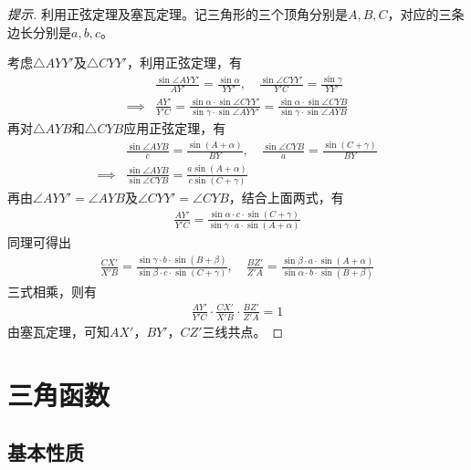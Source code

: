 \begin{proof}[提示]利用正弦定理及塞瓦定理。记三角形的三个顶角分别是$A,B,C$，对应的三条边长分别是$a,b,c$。

  考虑$\triangle AYY'$及$\triangle CYY'$，利用正弦定理，有
  \begin{align*}
    &\frac{\sin\angle AYY'}{AY'} = \frac{\sin\alpha}{YY'}, \quad
      \frac{\sin\angle CYY'}{Y'C} = \frac{\sin\gamma}{YY'}\\[3pt]
    \implies& \frac{AY'}{Y'C} = \frac{\sin\alpha\cdot \sin\angle CYY'}{\sin\gamma\cdot\sin\angle AYY'}
              = \frac{\sin\alpha\cdot \sin\angle CYB}{\sin\gamma\cdot\sin\angle AYB}
  \end{align*}
  再对$\triangle AYB$和$\triangle CYB$应用正弦定理，有
  \begin{align*}
    &\frac{\sin\angle AYB}{c}=\frac{\sin(A+\alpha)}{BY},\quad
      \frac{\sin\angle CYB}{a}=\frac{\sin(C+\gamma)}{BY}\\
    \implies& \frac{\sin\angle AYB}{\sin\angle CYB}=\frac{a\sin(A+\alpha)}{c\sin(C+\gamma)}
  \end{align*}
  再由$\angle AYY' = \angle AYB$及$\angle CYY'=\angle CYB$，结合上面两式，有
  \begin{align*}
    \frac{AY'}{Y'C} = \frac{\sin\alpha\cdot c\cdot\sin(C+\gamma)}{\sin\gamma\cdot a\cdot\sin(A+\alpha)}
  \end{align*}
  同理可得出
  \begin{align*}
    \frac{CX'}{X'B}=\frac{\sin\gamma\cdot b\cdot\sin(B+\beta)}{\sin\beta\cdot c\cdot\sin(C+\gamma)},\quad
    \frac{BZ'}{Z'A}=\frac{\sin\beta\cdot a\cdot\sin(A+\alpha)}{\sin\alpha\cdot b\cdot\sin(B+\beta)}
  \end{align*}
  三式相乘，则有
  \begin{align*}
    \frac{AY'}{Y'C}\cdot\frac{CX'}{X'B}\cdot\frac{BZ'}{Z'A}=1
  \end{align*}
  由塞瓦定理，可知$AX'$，$BY'$，$CZ'$三线共点。
\end{proof}

\section{三角函数}
\label{sec:trigometric-functions}

\subsection{基本性质}
\label{sec:basic-properties-of-trigonometric-functions}

